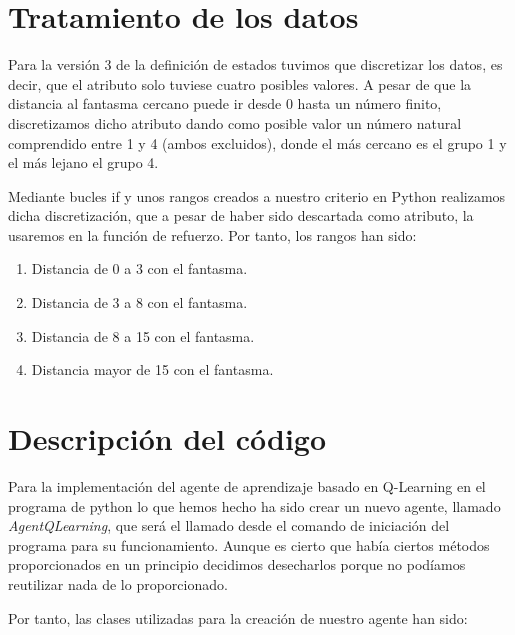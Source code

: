 \documentclass[11pt,a4paper]{article}
\begin{document}
\section{Tratamiento de los datos}

Para la versión 3 de la definición de estados tuvimos que discretizar los datos, es decir, que el atributo solo tuviese cuatro posibles valores. A pesar de que la distancia al fantasma cercano puede ir desde 0 hasta un número finito, discretizamos dicho atributo dando como posible valor un número natural comprendido entre 1 y 4 (ambos excluidos), donde el más cercano es el grupo 1 y el más lejano el grupo 4.

Mediante bucles if y unos rangos creados a nuestro criterio en Python realizamos dicha discretización, que a pesar de haber sido descartada como atributo, la usaremos en la función de refuerzo. Por tanto, los rangos han sido:

\begin{enumerate}
\item Distancia de 0 a 3 con el fantasma.
\item Distancia de 3 a 8 con el fantasma.
\item Distancia de 8 a 15 con el fantasma.
\item Distancia mayor de 15 con el fantasma.
\end{enumerate}

\section{Descripción del código}

Para la implementación del agente de aprendizaje basado en Q-Learning en el programa de python lo que hemos hecho ha sido crear un nuevo agente, llamado \textit{AgentQLearning}, que será el llamado desde el comando de iniciación del programa para su funcionamiento. Aunque es cierto que había ciertos métodos proporcionados en un principio decidimos desecharlos porque no podíamos reutilizar nada de lo proporcionado.

Por tanto, las clases utilizadas para la creación de nuestro agente han sido:
\end{document}
